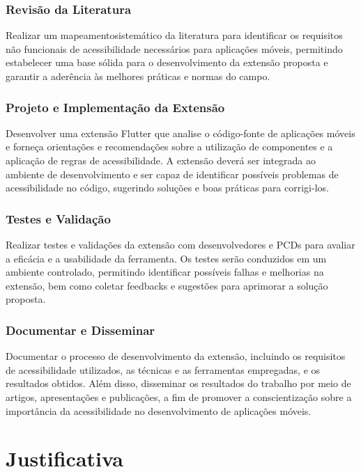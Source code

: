 \subsubsection{Revisão da Literatura}

Realizar um mapeamentosistemático da literatura para identificar os requisitos não funcionais de acessibilidade necessários para aplicações móveis, permitindo estabelecer uma base sólida para o desenvolvimento da extensão proposta e garantir a aderência às melhores práticas e normas do campo.

\subsubsection{Projeto e Implementação da Extensão}

Desenvolver uma extensão Flutter que analise o código-fonte de aplicações móveis e forneça orientações e recomendações sobre a utilização de componentes e a aplicação de regras de acessibilidade. A extensão deverá ser integrada ao ambiente de desenvolvimento e ser capaz de identificar possíveis problemas de acessibilidade no código, sugerindo soluções e boas práticas para corrigi-los.

\subsubsection{Testes e Validação}

Realizar testes e validações da extensão com desenvolvedores e PCDs para avaliar a eficácia e a usabilidade da ferramenta. Os testes serão conduzidos em um ambiente controlado, permitindo identificar possíveis falhas e melhorias na extensão, bem como coletar feedbacks e sugestões para aprimorar a solução proposta.

\subsubsection{Documentar e Disseminar}

Documentar o processo de desenvolvimento da extensão, incluindo os requisitos de acessibilidade utilizados, as técnicas e as ferramentas empregadas, e os resultados obtidos. Além disso, disseminar os resultados do trabalho por meio de artigos, apresentações e publicações, a fim de promover a conscientização sobre a importância da acessibilidade no desenvolvimento de aplicações móveis.

\section{Justificativa}

